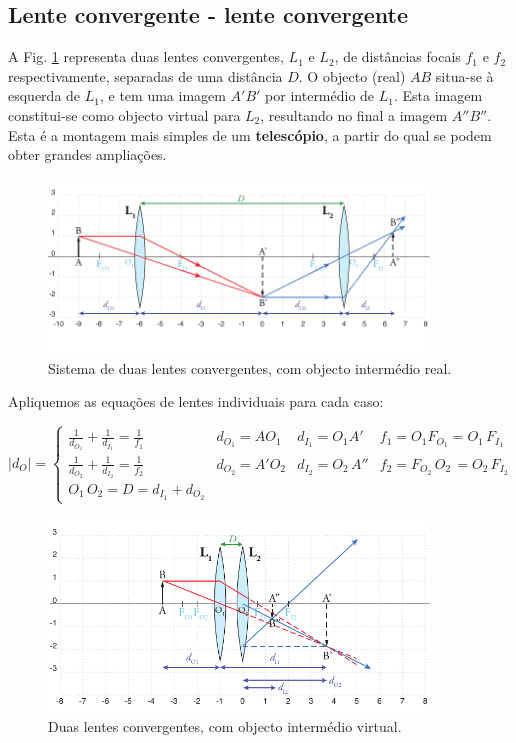 \documentclass[a4paper,twoside,11pt]{report}      %
\begin{document}
\subsection{\sf Lente convergente - lente convergente}
A Fig. \ref{fig:DuplaConvConv1} representa duas lentes convergentes, $L_1$ e $L_2$, de distâncias focais $f_1$ e $f_2$ respectivamente, separadas de uma distância $D$. O objecto (real) $AB$ situa-se à esquerda de $L_1$, e tem uma imagem $A'B'$ por intermédio de $L_1$. Esta imagem constitui-se como objecto virtual para $L_2$, resultando no final a imagem $A''B''$. Esta é a montagem mais simples de um \textbf{telescópio}, a partir do qual se podem obter grandes ampliações.

\begin{figure}	[t]  \centering 
	\includegraphics[width=0.9\textwidth]{9-DuplaConvConv1}
	\caption{Sistema de duas lentes convergentes, com objecto intermédio real. \label{fig:DuplaConvConv1}} 
\end{figure}

Apliquemos as equações de lentes individuais para cada caso:

\begin{equation}
|d_O|  =  \left\{
\begin{array}{llll}
 \frac{1}{d_{O_1}} +  \frac{1}{d_{I_1}}   = \frac{1}{f_1}  & d_{O_1} = AO_1 & d_{I_1} = O_1A' & f_1 = O_1 F_{O_1} = O_1\,F_{I_1} \\
 \frac{1}{d_{O_2}} +  \frac{1}{d_{I_2}}   = \frac{1}{f_2}  & d_{O_2} = A'O_2 & d_{I_2} = O_2\,A'' & f_2 =  F_{O_2}\,O_2\, = O_2\,F_{I_2} \\
O_1\,O_2 = D = d_{I_1} + d_{O_2}
\end{array}  \right.
\label{eq:assoclentes_2}
\end{equation}

\begin{figure}	[b]  \centering 
	\includegraphics[width=0.9\textwidth]{10-DuplaConvConv2}
	\caption{Duas lentes convergentes, com objecto intermédio virtual. \label{fig:DuplaConvConv2}} 
\end{figure}
\end{document}
